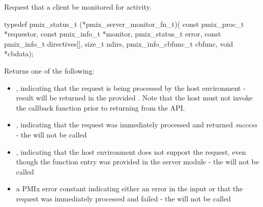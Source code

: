 \summary

Request that a client be monitored for activity.

\format

\cspecificstart
\begin{codepar}
typedef pmix_status_t (*pmix_server_monitor_fn_t)(
                             const pmix_proc_t *requestor,
                             const pmix_info_t *monitor,
                             pmix_status_t error,
                             const pmix_info_t directives[],
                             size_t ndirs,
                             pmix_info_cbfunc_t cbfunc,
                             void *cbdata);
\end{codepar}
\cspecificend

\begin{arglist}
\end{arglist}

Returns one of the following:

\begin{itemize}
    \item {}, indicating that the request is being processed by the host environment - result will be returned in the provided . Note that the host must not invoke the callback function prior to returning from the \ac{API}.
    \item {}, indicating that the request was immediately processed and returned \textit{success} - the  will not be called
    \item {}, indicating that the host environment does not support the request, even though the function entry was provided in the server module - the  will not be called
    \item a PMIx error constant indicating either an error in the input or that the request was immediately processed and failed - the  will not be called
\end{itemize}

